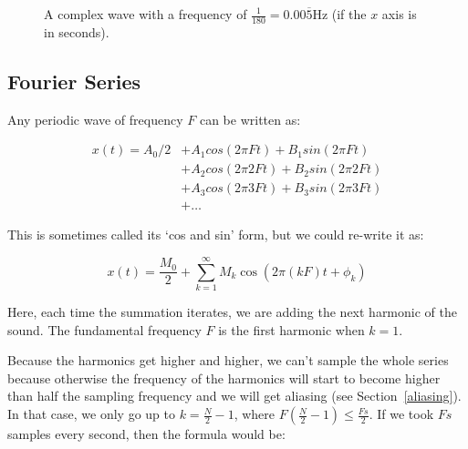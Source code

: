 \begin{figure}
  \centering
  \caption{A complex wave with a frequency of
  $\frac{1}{180} = 0.00\overline{5}\si{\hertz}$ (if the $x$ axis is in
  seconds).}
  \label{fig-complex-wave}
\end{figure} 

\subsection{Fourier Series}

Any periodic wave of frequency $F$ can be written as:

\begin{align*}
  x(t) = A_0 / 2 &+ A_1 cos(2 \pi Ft) + B_1 sin(2\pi Ft)\\
                 &+ A_2 cos(2 \pi 2Ft) + B_2 sin(2\pi 2Ft)\\
                 &+ A_3 cos(2 \pi 3Ft) + B_3 sin(2\pi 3Ft)\\
                 &+ \dots
\end{align*}

This is sometimes called its `cos and sin' form, but we could re-write it as:

\[
  x(t) = \frac{M_0}{2} + \sum\limits^\infty_{k=1}M_k\cos(2\pi (kF)t + \phi_k)
\]

Here, each time the summation iterates, we are adding the next harmonic of the
sound. The fundamental frequency $F$ is the first harmonic when $k=1$.

Because the harmonics get higher and higher, we can't sample the whole series
because otherwise the frequency of the harmonics will start to become higher
than half the sampling frequency and we will get aliasing (see
Section~\ref{aliasing}). In that case, we only go up to $k=\frac{N}{2} - 1$,
where $F(\frac{N}{2} - 1) \le \frac{Fs}{2}$. If we took $Fs$ samples every
second, then the formula would be:

